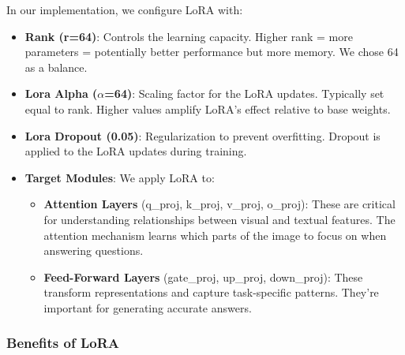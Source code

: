 \documentclass[conference]{IEEEtran}
\begin{document}
In our implementation, we configure LoRA with:

\begin{itemize}
    \item \textbf{Rank (r=64)}: Controls the learning capacity. Higher rank = more parameters = potentially better performance but more memory. We chose 64 as a balance.
    
    \item \textbf{Lora Alpha ($\alpha$=64)}: Scaling factor for the LoRA updates. Typically set equal to rank. Higher values amplify LoRA's effect relative to base weights.
    
    \item \textbf{Lora Dropout (0.05)}: Regularization to prevent overfitting. Dropout is applied to the LoRA updates during training.
    
    \item \textbf{Target Modules}: We apply LoRA to:
    \begin{itemize}
        \item \textbf{Attention Layers} (q\_proj, k\_proj, v\_proj, o\_proj): These are critical for understanding relationships between visual and textual features. The attention mechanism learns which parts of the image to focus on when answering questions.
        
        \item \textbf{Feed-Forward Layers} (gate\_proj, up\_proj, down\_proj): These transform representations and capture task-specific patterns. They're important for generating accurate answers.
    \end{itemize}
\end{itemize}

\subsubsection{Benefits of LoRA}
\end{document}
